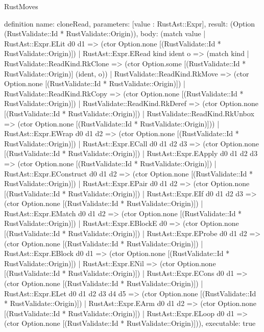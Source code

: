 \begin{lexlean}{RustMoves}
\begin{semanticmodule}
definition{
  name: cloneRead,
  parameters: [value : RustAst::Expr],
  result: (Option (RustValidate::Id * RustValidate::Origin)),
  body: (match value
    | RustAst::Expr.ELit d0 d1 => (ctor Option.none [(RustValidate::Id * RustValidate::Origin)])
    | RustAst::Expr.ERead kind ident o => (match kind
      | RustValidate::ReadKind.RkClone => (ctor Option.some [(RustValidate::Id * RustValidate::Origin)] (ident, o))
      | RustValidate::ReadKind.RkMove => (ctor Option.none [(RustValidate::Id * RustValidate::Origin)])
      | RustValidate::ReadKind.RkCopy => (ctor Option.none [(RustValidate::Id * RustValidate::Origin)])
      | RustValidate::ReadKind.RkDeref => (ctor Option.none [(RustValidate::Id * RustValidate::Origin)])
      | RustValidate::ReadKind.RkUnbox => (ctor Option.none [(RustValidate::Id * RustValidate::Origin)]))
    | RustAst::Expr.EWrap d0 d1 d2 => (ctor Option.none [(RustValidate::Id * RustValidate::Origin)])
    | RustAst::Expr.ECall d0 d1 d2 d3 => (ctor Option.none [(RustValidate::Id * RustValidate::Origin)])
    | RustAst::Expr.EApply d0 d1 d2 d3 => (ctor Option.none [(RustValidate::Id * RustValidate::Origin)])
    | RustAst::Expr.EConstruct d0 d1 d2 => (ctor Option.none [(RustValidate::Id * RustValidate::Origin)])
    | RustAst::Expr.EPair d0 d1 d2 => (ctor Option.none [(RustValidate::Id * RustValidate::Origin)])
    | RustAst::Expr.EIf d0 d1 d2 d3 => (ctor Option.none [(RustValidate::Id * RustValidate::Origin)])
    | RustAst::Expr.EMatch d0 d1 d2 => (ctor Option.none [(RustValidate::Id * RustValidate::Origin)])
    | RustAst::Expr.EBlockE d0 => (ctor Option.none [(RustValidate::Id * RustValidate::Origin)])
    | RustAst::Expr.EProbe d0 d1 d2 => (ctor Option.none [(RustValidate::Id * RustValidate::Origin)])
    | RustAst::Expr.EBlock d0 d1 => (ctor Option.none [(RustValidate::Id * RustValidate::Origin)])
    | RustAst::Expr.ENil => (ctor Option.none [(RustValidate::Id * RustValidate::Origin)])
    | RustAst::Expr.ECons d0 d1 => (ctor Option.none [(RustValidate::Id * RustValidate::Origin)])
    | RustAst::Expr.ELet d0 d1 d2 d3 d4 d5 => (ctor Option.none [(RustValidate::Id * RustValidate::Origin)])
    | RustAst::Expr.EArm d0 d1 d2 => (ctor Option.none [(RustValidate::Id * RustValidate::Origin)])
    | RustAst::Expr.ELoop d0 d1 => (ctor Option.none [(RustValidate::Id * RustValidate::Origin)])),
  executable: true
}


\end{semanticmodule}
\end{lexlean}
